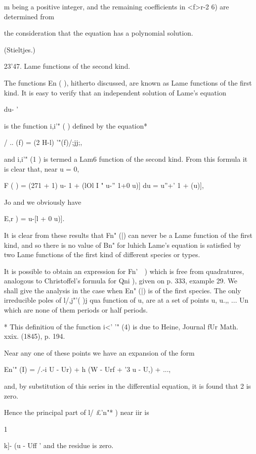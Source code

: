 {{{{{{{m being a positive integer, and the remaining coefficients in <f>r-2
6) are determined from

the consideration that the equation has a polynomial solution.

(Stieltjes.)

23'47. Lame functions of the second kind.

The functions En ( ), hitherto discussed, are known as Lame functions
of the first kind. It is easy to verify that an independent solution
of Lame's equation

du- '

is the function i,i'" ( ) defined by the equation*

/ .. (f) = (2 H-l) '"(f)/;jj;,

and i,i'" (1 ) is termed a Lam6 function of the second kind. From
this formula it is clear that, near u = 0,

F ( ) = (271 + 1) u- 1 + (lOl I " u-'' 1+0 u)] du = u''+' 1 + (u)],

Jo and we obviously have

E,r ) = u-[l + 0 u)].

It is clear from these results that Fn" (|) can never be a Lame
function of the first kind, and so there is no value of Bn" for luhich
Lame's equation is satisfied by two Lame functions of the first kind
of different species or types.

It is possible to obtain an expression for Fn'\ \ ) which is free from
quadratures, analogous to Christoffel's formula for Qni ), given on p.
333, example 29. We shall give the analysis in the case when En" (|)
is of the first species. The only irreducible poles of l/,j"'( )j qua
function of u, are at a set of points u, u.,, ... Un which are none
of them periods or half periods.

* This definitiou of the function i<' '" (4) is due to Heine, Journal
fUr Math. xxix. (1845), p. 194.

%
%

Near any one of these points we have an expansion of the form

En'" (I) = /.-i U - Ur) + h (W - Urf + '3 u - U,) + ...,

and, by substitution of this series in the differential equation, it
is found that 2 is zero.

Hence the principal part of l/ £'n"* ) near iir is

1

k]- (u - Uff ' and the residue is zero.

}}}}}}}
